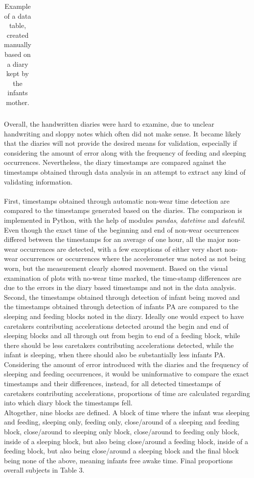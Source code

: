 \documentclass{article}
\begin{document}
{\begin{table}[h]
\begin{tabular}{|l|l|l|l|l|l|}
\end{tabular}
\caption{Example of a data table, created manually based on a diary kept by the infants mother.}
\end{table}
Overall, the handwritten diaries were hard to examine, due to unclear handwriting and sloppy notes which often did not make sense. It became likely that the diaries will not provide the desired means for validation, especially if considering the amount of error along with the frequency of feeding and sleeping occurrences. Nevertheless, the diary timestamps are compared against the timestamps obtained through data analysis in an attempt to extract any kind of validating information. \\
\\First, timestamps obtained through automatic non-wear time detection are compared to the timestamps generated based on the diaries. The comparison is implemented in Python, with the help of modules \textit{pandas}, \textit{datetime} and \textit{dateutil}. Even though the exact time of the beginning and end of non-wear occurrences differed between the timestamps for an average of one hour, all the major non-wear occurrences are detected, with a few exceptions of either very short non-wear occurrences or occurrences where the accelerometer was noted as not being worn, but the measurement clearly showed movement. Based on the visual examination of plots with no-wear time marked, the time-stamp differences are due to the errors in the diary based timestamps and not in the data analysis.
\\Second, the timestamps obtained through detection of infant being moved and the timestamps obtained through detection of infants PA are compared to the sleeping and feeding blocks noted in the diary. Ideally one would expect to have caretakers contributing accelerations detected around the begin and end of sleeping blocks and all through out from begin to end of a feeding block, while there should be less caretakers contributing accelerations detected, while the infant is sleeping, when there should also be substantially less infants PA. Considering the amount of error introduced with the diaries and the frequency of sleeping and feeding occurrences, it would be uninformative to compare the exact timestamps and their differences, instead, for all detected timestamps of caretakers contributing accelerations, proportions of time are calculated regarding into which diary block the timestamps fell.\\Altogether, nine blocks are defined. A block of time where the infant was sleeping and feeding, sleeping only, feeding only, close/around of a sleeping and feeding block, close/around to sleeping only block, close/around to feeding only block, inside of a sleeping block, but also being close/around a feeding block, inside of a feeding block, but also being close/around a sleeping block and the final block being none of the above, meaning infants free awake time. Final proportions overall subjects in Table 3.
}
\end{document}
